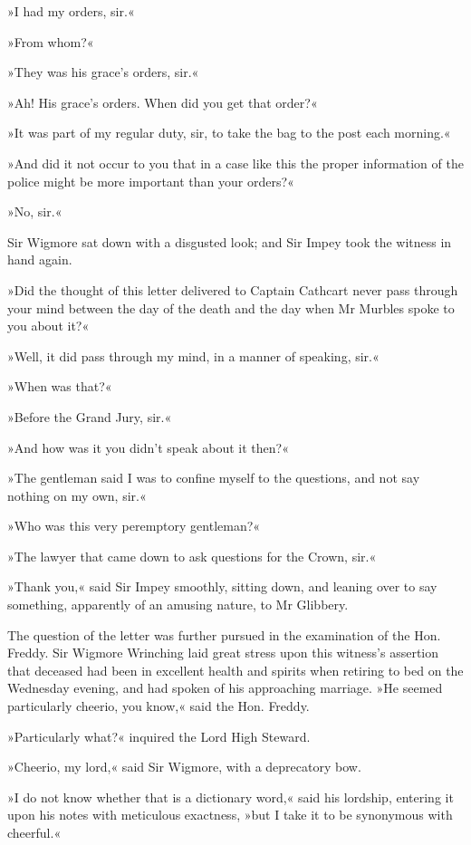 »I had my orders, sir.«

»From whom?«

»They was his grace's orders, sir.«

»Ah! His grace's orders. When did you get that order?«

»It was part of my regular duty, sir, to take the bag to the post each morning.«

»And did it not occur to you that in a case like this the proper information of the police might be more important than your orders?«

»No, sir.«

Sir Wigmore sat down with a disgusted look; and Sir Impey took the witness in hand again.

»Did the thought of this letter delivered to Captain Cathcart never pass through your mind between the day of the death and the day when Mr Murbles spoke to you about it?«

»Well, it did pass through my mind, in a manner of speaking, sir.«

»When was that?«

»Before the Grand Jury, sir.«

»And how was it you didn't speak about it then?«

»The gentleman said I was to confine myself to the questions, and not say nothing on my own, sir.«

»Who was this very peremptory gentleman?«

»The lawyer that came down to ask questions for the Crown, sir.«

»Thank you,« said Sir Impey smoothly, sitting down, and leaning over to say something, apparently of an amusing nature, to Mr Glibbery.

The question of the letter was further pursued in the examination of the Hon. Freddy. Sir Wigmore Wrinching laid great stress upon this witness's assertion that deceased had been in excellent health and spirits when retiring to bed on the Wednesday evening, and had spoken of his approaching marriage. »He seemed particularly cheerio, you know,« said the Hon. Freddy.

»Particularly what?« inquired the Lord High Steward.

»Cheerio, my lord,« said Sir Wigmore, with a deprecatory bow.

»I do not know whether that is a dictionary word,« said his lordship, entering it upon his notes with meticulous exactness, »but I take it to be synonymous with cheerful.«

